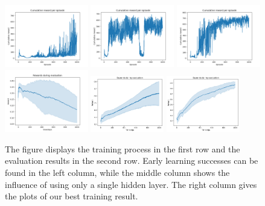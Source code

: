 \begin{figure} [H]
	\includegraphics[width=0.325\textwidth]{plots/ddpg_ball_first_train.png}
	\includegraphics[width=0.325\textwidth]{plots/ddpg_ball_1layer_train.png}
	\includegraphics[width=0.325\textwidth]{plots/ddpg_ball_best_train.png}
	\includegraphics[width=0.325\textwidth]{plots/ddpg_ball_first_eval.png}
	\hspace*{2.1mm}\includegraphics[width=0.285\textwidth]{plots/DDPGballbalancer24-2-16.png}
	\hspace*{5.2mm}\includegraphics[width=0.285\textwidth]{plots/DDPGballbalancer26-2-20.png}
	
	\caption{The figure displays the training process in the first row and the evaluation results in the second row. Early learning successes can be found in the left column, while the middle column shows the influence of using only a single hidden layer. The right column gives the plots of our best training result.}
	\label{ddpg:ball}
\end{figure}
